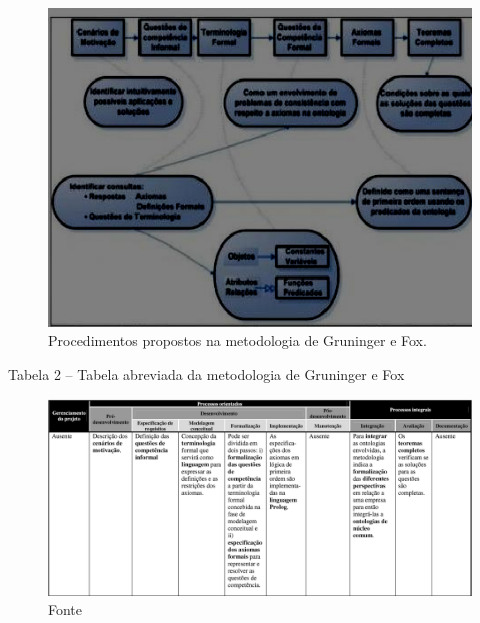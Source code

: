 \documentclass[a4paper]{report}
\begin{document}
\begin{figure}[h] 
\centering %
\includegraphics[scale=0.65]{Figuras/3.png} %
\caption[Procedimentos propostos na metodologia de Gruninger e Fox]{Procedimentos propostos na metodologia de Gruninger e Fox. %
}
\end{figure}

Tabela 2 – Tabela abreviada da metodologia de Gruninger e Fox

\begin{figure}[h] 
\centering %
\includegraphics[scale=0.3]{Figuras/4.png} %
\caption{Fonte%
}
\end{figure}
\end{document}
